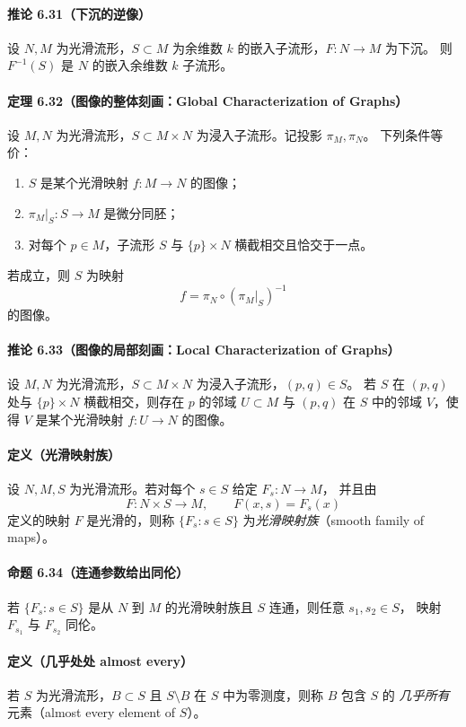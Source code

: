 \documentclass[11pt,a4paper]{article}
\begin{document}
\paragraph{推论 6.31（下沉的逆像）}
设 $N,M$ 为光滑流形，$S\subset M$ 为余维数 $k$ 的嵌入子流形，$F:N\to M$ 为下沉。
则 $F^{-1}(S)$ 是 $N$ 的嵌入余维数 $k$ 子流形。

\paragraph{定理 6.32（图像的整体刻画：Global Characterization of Graphs）}
设 $M,N$ 为光滑流形，$S\subset M\times N$ 为浸入子流形。记投影 $\pi_M,\pi_N$。
下列条件等价：
\begin{enumerate}
\item[(a)] $S$ 是某个光滑映射 $f:M\to N$ 的图像；
\item[(b)] $\pi_M|_S:S\to M$ 是微分同胚；
\item[(c)] 对每个 $p\in M$，子流形 $S$ 与 $\{p\}\times N$ 横截相交且恰交于一点。
\end{enumerate}
若成立，则 $S$ 为映射
\[
f=\pi_N\circ(\pi_M|_S)^{-1}
\]
的图像。

\paragraph{推论 6.33（图像的局部刻画：Local Characterization of Graphs）}
设 $M,N$ 为光滑流形，$S\subset M\times N$ 为浸入子流形，$(p,q)\in S$。
若 $S$ 在 $(p,q)$ 处与 $\{p\}\times N$ 横截相交，则存在 $p$ 的邻域 $U\subset M$ 与
$(p,q)$ 在 $S$ 中的邻域 $V$，使得 $V$ 是某个光滑映射 $f:U\to N$ 的图像。

\paragraph{定义（光滑映射族）}
设 $N,M,S$ 为光滑流形。若对每个 $s\in S$ 给定 $F_s:N\to M$，
并且由
\[
F:N\times S\to M,\qquad F(x,s)=F_s(x)
\]
定义的映射 $F$ 是光滑的，则称 $\{F_s:s\in S\}$ 为\emph{光滑映射族}（smooth family of maps）。

\paragraph{命题 6.34（连通参数给出同伦）}
若 $\{F_s:s\in S\}$ 是从 $N$ 到 $M$ 的光滑映射族且 $S$ 连通，则任意 $s_1,s_2\in S$，
映射 $F_{s_1}$ 与 $F_{s_2}$ 同伦。

\paragraph{定义（几乎处处 almost every）}
若 $S$ 为光滑流形，$B\subset S$ 且 $S\setminus B$ 在 $S$ 中为零测度，则称 $B$ 包含 $S$ 的
\emph{几乎所有}元素（almost every element of $S$）。
\end{document}
